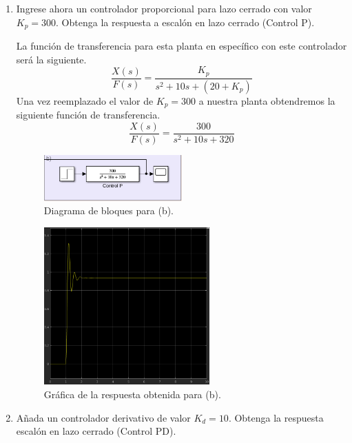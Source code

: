 \documentclass[12pt, letterpaper]{article}
\begin{document}
\begin{enumerate}
\begin{enumerate}
			\item Ingrese ahora un controlador proporcional para lazo cerrado con valor $K_p = 300$. Obtenga la respuesta a escalón en lazo cerrado (Control P).

				La función de transferencia para esta planta en específico con este controlador será la siguiente.
				\begin{equation}
					\frac{X(s)}{F(s)} = \frac{K_p}{s^2 + 10s + (20 + K_p)}
				\end{equation}
				Una vez reemplazado el valor de $K_p =  300$ a nuestra planta obtendremos la siguiente función de transferencia.
				\begin{equation}
					\frac{X(s)}{F(s)} = \frac{300}{s^2 + 10s + 320}
				\end{equation}
				\begin{figure}[H]
					\centering
					\includegraphics[width=0.5\textwidth]{1b.png}
					\caption{Diagrama de bloques para (b).}
				\end{figure}

				\begin{figure}[H]
					\centering
					\includegraphics[width=0.6\textwidth]{1bb.png}
					\caption{Gráfica de la respuesta obtenida para (b).}
				\end{figure}
			
			\item Añada un controlador derivativo de valor $K_d = 10$. Obtenga la respuesta escalón en lazo cerrado (Control PD).


\end{enumerate}
\end{enumerate}
\end{document}
